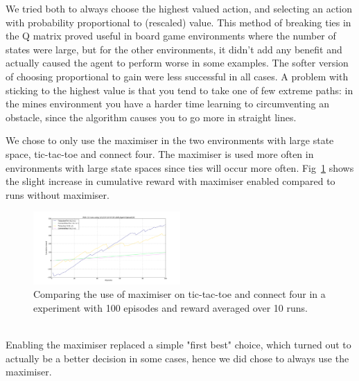 We tried both to always choose
the highest valued action, and selecting an action with probability proportional
to (rescaled) value. This method of breaking ties in the Q matrix proved useful
in board game environments  where the number of states were large, but for the
other environments, it didn't add any benefit and actually caused the agent to
perform worse in some examples. The softer version of choosing proportional to
gain were less successful in all cases. A problem with sticking to the highest
value is that you tend to take one of few extreme paths: in the mines
environment you have a harder time learning to circumventing an obstacle, since
the algorithm causes you to go more in straight lines.

We chose to only use the maximiser in the two environments with large state space, tic-tac-toe and connect four. The maximiser is used more often in environments with large state spaces since ties will occur more often. Fig~\ref{fig:tiemaximiser} shows the slight increase in cumulative reward with maximiser enabled compared to runs without maximiser.
\begin{figure}[h]
    \centering
    \includegraphics[width=0.5\textwidth]{../data/tiebreakerplotconnectfourtictactoe.png}
    \caption{Comparing the use of maximiser on tic-tac-toe and connect four in a experiment with 100 episodes and reward averaged over 10 runs. }
    \label{fig:tiemaximiser}
\end{figure}\\
Enabling the maximiser replaced a simple "first best" choice, which turned out to actually be a better decision in some cases, hence we did chose to always use the maximiser.


